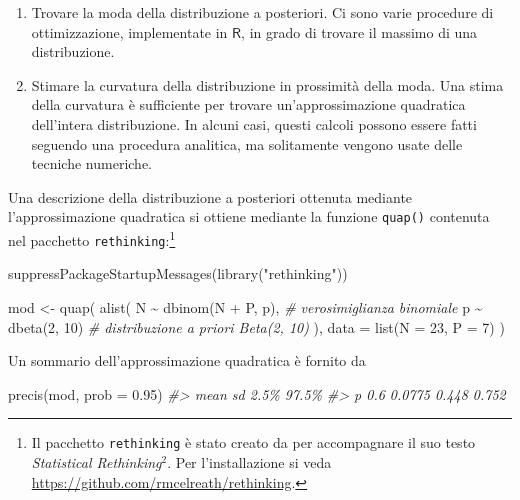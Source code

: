 \documentclass[
  10pt,
  italian,
  a4paper,
  extrafontsizes,onecolumn,openright
  ]{memoir}
\newenvironment{Shaded}{\begin{snugshade}}{\end{snugshade}}
\newcommand{\AttributeTok}[1]{\textcolor[rgb]{0.77,0.63,0.00}{#1}}
\newcommand{\CommentTok}[1]{\textcolor[rgb]{0.56,0.35,0.01}{\textit{#1}}}
\newcommand{\DecValTok}[1]{\textcolor[rgb]{0.00,0.00,0.81}{#1}}
\newcommand{\FloatTok}[1]{\textcolor[rgb]{0.00,0.00,0.81}{#1}}
\newcommand{\FunctionTok}[1]{\textcolor[rgb]{0.00,0.00,0.00}{#1}}
\newcommand{\NormalTok}[1]{#1}
\newcommand{\OtherTok}[1]{\textcolor[rgb]{0.56,0.35,0.01}{#1}}
\newcommand{\SpecialCharTok}[1]{\textcolor[rgb]{0.00,0.00,0.00}{#1}}
\newcommand{\StringTok}[1]{\textcolor[rgb]{0.31,0.60,0.02}{#1}}
\providecommand{\tightlist}{%
  \setlength{\itemsep}{0pt}\setlength{\parskip}{0pt}}
\newcommand{\R}{\textsf{R}} %
\begin{document}
\begin{enumerate}
\def\labelenumi{\arabic{enumi}.}
\tightlist
\item
  Trovare la moda della distribuzione a posteriori. Ci sono varie
  procedure di ottimizzazione, implementate in \(\R\), in
  grado di trovare il massimo di una distribuzione.
\item
  Stimare la curvatura della distribuzione in prossimità della moda.
  Una stima della curvatura è sufficiente per trovare
  un'approssimazione quadratica dell'intera distribuzione. In alcuni
  casi, questi calcoli possono essere fatti seguendo una procedura
  analitica, ma solitamente vengono usate delle tecniche numeriche.
\end{enumerate}

Una descrizione della distribuzione a posteriori ottenuta mediante l'approssimazione quadratica si ottiene mediante la funzione \texttt{quap()} contenuta nel pacchetto \texttt{rethinking}:\footnote{Il pacchetto \texttt{rethinking} è stato creato da \textcite{McElreath_rethinking} per accompagnare il suo testo \emph{Statistical Rethinking}\(^2\). Per l'installazione si veda \url{https://github.com/rmcelreath/rethinking}.}

\begin{Shaded}
\begin{Highlighting}[]
\FunctionTok{suppressPackageStartupMessages}\NormalTok{(}\FunctionTok{library}\NormalTok{(}\StringTok{"rethinking"}\NormalTok{))}

\NormalTok{mod }\OtherTok{\textless{}{-}} \FunctionTok{quap}\NormalTok{(}
  \FunctionTok{alist}\NormalTok{(}
\NormalTok{  N }\SpecialCharTok{\textasciitilde{}} \FunctionTok{dbinom}\NormalTok{(N }\SpecialCharTok{+}\NormalTok{ P, p), }\CommentTok{\# verosimiglianza binomiale}
\NormalTok{  p }\SpecialCharTok{\textasciitilde{}} \FunctionTok{dbeta}\NormalTok{(}\DecValTok{2}\NormalTok{, }\DecValTok{10}\NormalTok{) }\CommentTok{\# distribuzione a priori Beta(2, 10)}
\NormalTok{  ),}
  \AttributeTok{data =} \FunctionTok{list}\NormalTok{(}\AttributeTok{N =} \DecValTok{23}\NormalTok{, }\AttributeTok{P =} \DecValTok{7}\NormalTok{)}
\NormalTok{)}
\end{Highlighting}
\end{Shaded}

Un sommario dell'approssimazione quadratica è fornito da

\begin{Shaded}
\begin{Highlighting}[]
\FunctionTok{precis}\NormalTok{(mod, }\AttributeTok{prob =} \FloatTok{0.95}\NormalTok{)}
\CommentTok{\#\textgreater{}   mean     sd  2.5\% 97.5\%}
\CommentTok{\#\textgreater{} p  0.6 0.0775 0.448 0.752}
\end{Highlighting}
\end{Shaded}
\end{document}
